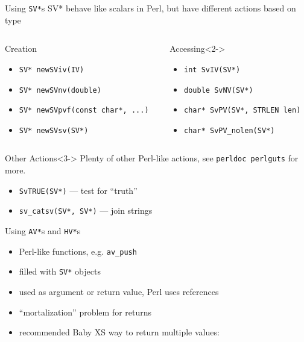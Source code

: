 \documentclass{beamer}
\providecommand{\code}[1]{{\texttt{\scriptsize{#1}}}}
\begin{document}
\begin{frame}{Using \texttt{SV*}s}
  SV* behave like scalars in Perl, but have different actions based on type
  \begin{columns}
    \begin{column}{0.54\linewidth}
      \begin{block}{Creation}
        \begin{itemize}
          \item \code{SV* newSViv(IV)}
          \item \code{SV* newSVnv(double)}
          \item \code{SV* newSVpvf(const char*, ...)}
          \item \code{SV* newSVsv(SV*)}
        \end{itemize}
      \end{block}
    \end{column}
    \begin{column}{0.44\linewidth}
      \begin{block}{Accessing}<2->
        \begin{itemize}
          \item \code{int SvIV(SV*)}
          \item \code{double SvNV(SV*)}
          \item \code{char* SvPV(SV*, STRLEN len)}
          \item \code{char* SvPV\_nolen(SV*)}
        \end{itemize}
      \end{block}
    \end{column}
  \end{columns}
  \begin{block}{Other Actions}<3->
    Plenty of other Perl-like actions, see \code{perldoc perlguts} for more.
    \begin{itemize}
      \item \code{SvTRUE(SV*)} --- test for ``truth''
      \item \code{sv\_catsv(SV*, SV*)} --- join strings
    \end{itemize}
  \end{block}
\end{frame}

\begin{frame}[fragile]{Using \texttt{AV*}s and \texttt{HV*}s}
  \begin{itemize}
    \item Perl-like functions, e.g. \code{av\_push}
    \item filled with \code{SV*} objects
    \item used as argument or return value, Perl uses references
    \item ``mortalization'' problem for returns
    \item recommended Baby XS way to return multiple values:
  \end{itemize}
  \vfill
  \begin{block}{}
    \scriptsize
    
  \end{block}
\end{frame}
\end{document}
